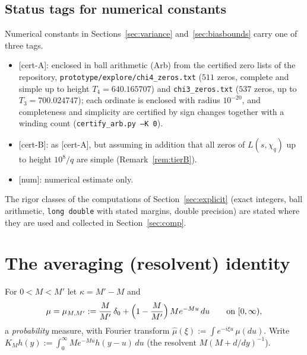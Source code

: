 \documentclass[11pt]{amsart}
\theoremstyle{definition}
\numberwithin{equation}{section}
\newcommand{\certA}{\textsf{[cert-A]}}
\newcommand{\certB}{\textsf{[cert-B]}}
\newcommand{\numtag}{\textsf{[num]}}
\begin{document}
\subsection{Status tags for numerical constants}\label{subsec:tags}
Numerical constants in Sections~\ref{sec:variance}
and~\ref{sec:biasbounds} carry one of three tags.
\begin{itemize}
\item \certA: enclosed in ball arithmetic (Arb) from the certified
zero lists of the repository,
\texttt{prototype/explore/chi4\_zeros.txt} ($511$ zeros, complete and
simple up to height $T_4=640.165707$) and
\texttt{chi3\_zeros.txt} ($537$ zeros, up to $T_3=700.024747$); each
ordinate is enclosed with radius $10^{-20}$, and completeness and
simplicity are certified by sign changes together with a winding
count (\texttt{certify\_arb.py --K 0}).
\item \certB: as \certA, but assuming in addition that all zeros of
$L(s,\chi_q)$ up to height $10^8/q$ are simple
(Remark~\ref{rem:tierB}).
\item \numtag: numerical estimate only.
\end{itemize}
The rigor classes of the computations of Section~\ref{sec:explicit}
(exact integers, ball arithmetic, \texttt{long double} with stated
margins, double precision) are stated where they are used and
collected in Section~\ref{sec:comp}.

\section{The averaging (resolvent) identity}\label{sec:resolvent}

For $0<M<M'$ let $\kappa=M'-M$ and
\begin{equation}\label{eq:defmu}
\mu=\mu_{M,M'}:=\frac{M}{M'}\,\delta_0
+\Bigl(1-\frac{M}{M'}\Bigr)\,Me^{-Mu}\,du\qquad\text{on }[0,\infty),
\end{equation}
a \emph{probability} measure, with Fourier transform
$\hat\mu(\xi):=\int e^{-i\xi u}\,\mu(du)$. Write
$K_Mh(y):=\int_0^\infty Me^{-Mu}h(y-u)\,du$ (the resolvent
$M(M+d/dy)^{-1}$).
\end{document}
